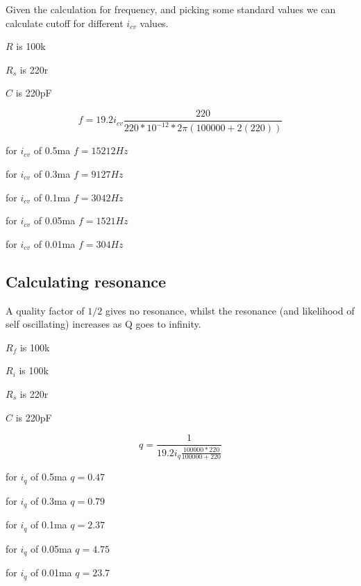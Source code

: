 \documentclass{article}
\begin{document}
Given the calculation for frequency, and picking some standard values we can calculate cutoff for different $i_{cv}$ values.

\begin{description}
  \item $R$ is 100k
  \item $R_s$ is 220r
  \item $C$ is 220pF
\end{description}

\begin{equation}
  f = 19.2i_{cv}\frac{220}{220 * 10^{-12} * 2\pi(100000 + 2(220))}
\end{equation}

\begin{description}
  \item for $i_{cv}$ of 0.5ma $f = 15212Hz$
  \item for $i_{cv}$ of 0.3ma $f = 9127Hz$
  \item for $i_{cv}$ of 0.1ma $f = 3042Hz$
  \item for $i_{cv}$ of 0.05ma $f = 1521Hz$
  \item for $i_{cv}$ of 0.01ma $f = 304Hz$
\end{description}

\subsection{Calculating resonance}

A quality factor of $1/2$ gives no resonance, whilst the resonance (and likelihood of self oscillating) increases as Q goes to infinity.

\begin{description}
  \item $R_f$ is 100k
  \item $R_i$ is 100k
  \item $R_s$ is 220r
  \item $C$ is 220pF
\end{description}

\begin{equation}
  q = \frac{1}{19.2i_{q}\frac{100000 * 220}{100000 + 220}}
\end{equation}

\begin{description}
  \item for $i_{q}$ of 0.5ma $q = 0.47$
  \item for $i_{q}$ of 0.3ma $q = 0.79$
  \item for $i_{q}$ of 0.1ma $q = 2.37$
  \item for $i_{q}$ of 0.05ma $q = 4.75$
  \item for $i_{q}$ of 0.01ma $q = 23.7$
\end{description}
\end{document}
